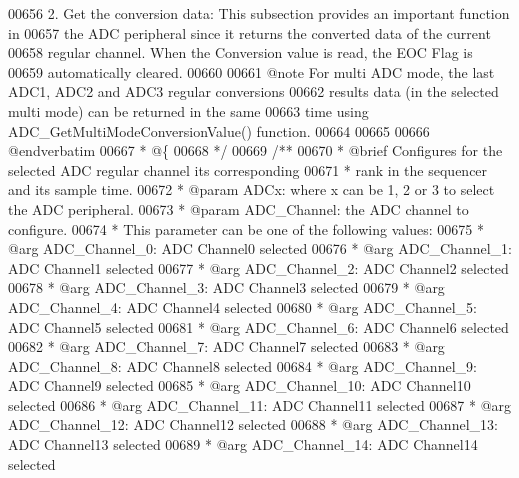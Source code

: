 \begin{DoxyCode}
00656 \textcolor{comment}{  2. Get the conversion data: This subsection provides an important function in }
00657 \textcolor{comment}{     the ADC peripheral since it returns the converted data of the current }
00658 \textcolor{comment}{     regular channel. When the Conversion value is read, the EOC Flag is }
00659 \textcolor{comment}{     automatically cleared.}
00660 \textcolor{comment}{     }
00661 \textcolor{comment}{     @note For multi ADC mode, the last ADC1, ADC2 and ADC3 regular conversions }
00662 \textcolor{comment}{           results data (in the selected multi mode) can be returned in the same }
00663 \textcolor{comment}{           time using ADC\_GetMultiModeConversionValue() function. }
00664 \textcolor{comment}{       }
00665 \textcolor{comment}{  }
00666 \textcolor{comment}{@endverbatim}
00667 \textcolor{comment}{  * @\{}
00668 \textcolor{comment}{  */}
00669 \textcolor{comment}{/**}
00670 \textcolor{comment}{  * @brief  Configures for the selected ADC regular channel its corresponding}
00671 \textcolor{comment}{  *         rank in the sequencer and its sample time.}
00672 \textcolor{comment}{  * @param  ADCx: where x can be 1, 2 or 3 to select the ADC peripheral.}
00673 \textcolor{comment}{  * @param  ADC\_Channel: the ADC channel to configure. }
00674 \textcolor{comment}{  *          This parameter can be one of the following values:}
00675 \textcolor{comment}{  *            @arg ADC\_Channel\_0: ADC Channel0 selected}
00676 \textcolor{comment}{  *            @arg ADC\_Channel\_1: ADC Channel1 selected}
00677 \textcolor{comment}{  *            @arg ADC\_Channel\_2: ADC Channel2 selected}
00678 \textcolor{comment}{  *            @arg ADC\_Channel\_3: ADC Channel3 selected}
00679 \textcolor{comment}{  *            @arg ADC\_Channel\_4: ADC Channel4 selected}
00680 \textcolor{comment}{  *            @arg ADC\_Channel\_5: ADC Channel5 selected}
00681 \textcolor{comment}{  *            @arg ADC\_Channel\_6: ADC Channel6 selected}
00682 \textcolor{comment}{  *            @arg ADC\_Channel\_7: ADC Channel7 selected}
00683 \textcolor{comment}{  *            @arg ADC\_Channel\_8: ADC Channel8 selected}
00684 \textcolor{comment}{  *            @arg ADC\_Channel\_9: ADC Channel9 selected}
00685 \textcolor{comment}{  *            @arg ADC\_Channel\_10: ADC Channel10 selected}
00686 \textcolor{comment}{  *            @arg ADC\_Channel\_11: ADC Channel11 selected}
00687 \textcolor{comment}{  *            @arg ADC\_Channel\_12: ADC Channel12 selected}
00688 \textcolor{comment}{  *            @arg ADC\_Channel\_13: ADC Channel13 selected}
00689 \textcolor{comment}{  *            @arg ADC\_Channel\_14: ADC Channel14 selected}

\end{DoxyCode}
